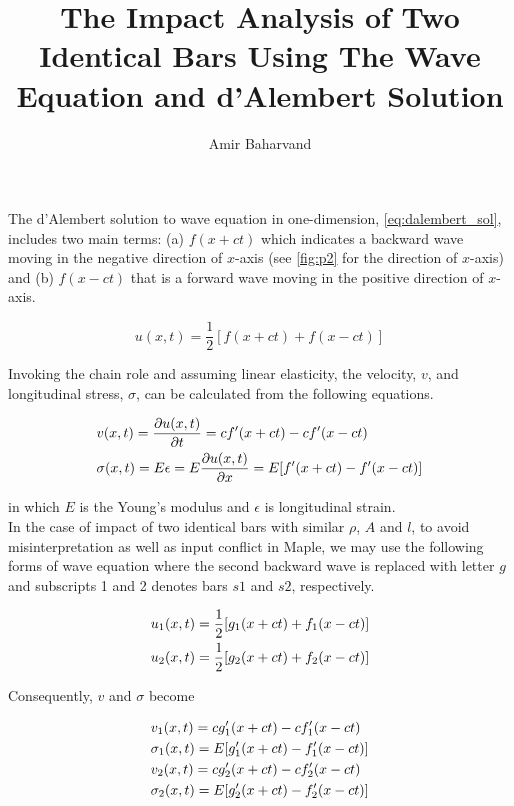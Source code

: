 \documentclass{article}
\title{The Impact Analysis of Two Identical Bars Using The Wave Equation and d'Alembert Solution}
\author{Amir Baharvand }
\date{}
\begin{document}
\maketitle

The d'Alembert solution to wave equation in one-dimension, \cref{eq:dalembert_sol}, includes two main terms: (a) $f(x + ct)$ which indicates a backward wave moving in the negative direction of $x$-axis (see \cref{fig:p2} for the direction of $x$-axis) and (b) $f(x - ct)$ that is a forward wave moving in the positive direction of $x$-axis. 

\begin{equation}
    u(x, t) = \frac{1}{2} [f(x + ct) + f(x - ct)]
    \label{eq:dalembert_sol}
\end{equation}

Invoking the chain role and assuming linear elasticity, the velocity, $v$, and longitudinal stress, $\sigma$, can be calculated from the following equations.

\begin{align}
    & v(x, t) = \frac{\partial u(x, t)}{\partial t} = c f'(x + ct) - c f'(x - ct) \notag\\ 
    & \sigma(x, t) = E \epsilon = E \frac{\partial u(x, t)}{\partial x} = E [f'(x + ct) - f'(x - ct)]
    \label{eq:v_s}
\end{align}

in which $E$ is the Young's modulus and $\epsilon$ is longitudinal strain. \\

In the case of impact of two identical bars with similar $\rho$, $A$ and $l$, to avoid misinterpretation as well as input conflict in Maple, we may use the following forms of wave equation where the second backward wave is replaced with letter $g$ and subscripts 1 and 2 denotes bars $s1$ and $s2$, respectively.

\begin{align}
    & u_1(x, t) = \frac{1}{2} [g_1(x + ct) + f_1(x - ct)] \notag\\ 
    & u_2(x, t) = \frac{1}{2} [g_2(x + ct) + f_2(x - ct)]
    \label{eq:dalembert_sol12}
\end{align}

Consequently, $v$ and $\sigma$ become

\begin{align}
    & v_1(x, t) = c g_1'(x + ct) - c f_1'(x - ct) \notag\\
    & \sigma_1(x, t) = E [g_1'(x + ct) - f_1'(x - ct)] \notag\\
    & v_2(x, t) = c g_2'(x + ct) - c f_2'(x - ct) \notag\\
    & \sigma_2(x, t) = E [g_2'(x + ct) - f_2'(x - ct)]
    \label{eq:v_s12}
\end{align}
\end{document}

